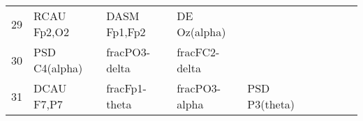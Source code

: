 \begin{landscape}
\begin{table}[]
\begin{tabular}{l|llllllll}
29                 & RCAU Fp2,O2          & DASM Fp1,Fp2            & DE Oz(alpha)         &                    &                       &                      &                 &                 \\
30                 & PSD C4(alpha)        & fracPO3-delta           & fracFC2-delta        &                    &                       &                      &                 &                 \\
31                 & DCAU F7,P7           & fracFp1-theta           & fracPO3-alpha        & PSD P3(theta)      &                       &                      &                 &                 \\
\end{tabular}
\end{table}
\end{landscape}
\clearpage
